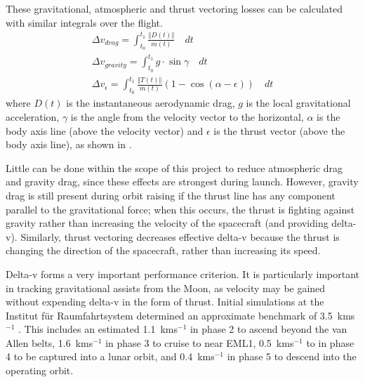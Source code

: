 These gravitational, atmospheric and thrust vectoring losses can be calculated with similar integrals over the flight. 
\begin{gather}
\Delta v_{drag}=\int_{t_0}^{t_1}\frac{\left\Vert D\left(t\right)\right\Vert }{m\left(t\right)}\quad dt\label{eq:drag-penalty} \\
\Delta v_{gravity}=\int_{t_0}^{t_1}g\cdot\sin\gamma\quad dt\label{eq:gravity-penalty} \\
\Delta v_\epsilon=\int_{t_0}^{t_1}\frac{\left\Vert T\left(t\right)\right\Vert }{m\left(t\right)}(1-\cos(\alpha-\epsilon))\quad dt\label{eq:thrust-vectoring-penalty}
\end{gather}
where $D(t)$ is the instantaneous aerodynamic drag, $g$ is the local gravitational acceleration, $\gamma$ is the angle from the velocity vector to the horizontal, $\alpha$ is the body axis line (above the velocity vector) and $\epsilon$ is the thrust vector (above the body axis line), as shown in \autocite{fig:path-angles} \parencite{Tetlow2003}. 

\begin{figure}
\begin{center}
\label{fig:path-angles}
\end{center}
\end{figure}

Little can be done within the scope of this project to reduce atmospheric drag and gravity drag, since these effects are strongest during launch. However, gravity drag is still present during orbit raising if the thrust line has any component parallel to the gravitational force; when this occurs, the thrust is fighting against gravity rather than increasing the velocity of the spacecraft (and providing delta-v). Similarly, thrust vectoring decreases effective delta-v because the thrust is changing the direction of the spacecraft, rather than increasing its speed. 

Delta-v forms a very important performance criterion. It is particularly important in tracking gravitational assists from the Moon, as velocity may be gained without expending delta-v in the form of thrust. Initial simulations at the Institut f\"{u}r Raumfahrtsystem determined an approximate benchmark of 3.5~kms$^{-1}$ \parencite{Roeser2006}. This includes an estimated 1.1~kms$^{-1}$ in phase 2 to ascend beyond the van Allen belts, 1.6~kms$^{-1}$ in phase 3 to cruise to near EML1, 0.5~kms$^{-1}$ to in phase 4 to be captured into a lunar orbit, and 0.4~kms$^{-1}$ in phase 5 to descend into the operating orbit.

